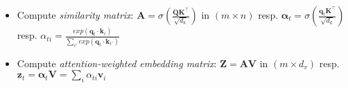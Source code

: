 \begin{itemize}
\begin{itemize}
\begin{multicols}{2}
\begin{itemize}
            \item $\boldsymbol{W}_v$ $(h \times d_v)$
            \item $\boldsymbol{V}$ $(n \times d_v)$
            \item $\boldsymbol{v}_i$ is row vector $(1 \times d_v)$
            \item $\boldsymbol{e}_i$ is row vector $(1 \times h)$
        \end{itemize}
        \end{multicols}
    \end{itemize}
    \item Compute \emph{similarity matrix}: $\boldsymbol{A} = \sigma(\frac{\boldsymbol{Q}\boldsymbol{K}^\intercal}{\sqrt{d_k}})$ in $(m \times n)$ resp. $\boldsymbol{\alpha}_{t} = \sigma(\frac{\boldsymbol{q}_t\boldsymbol{K}^\intercal}{\sqrt{d_k}})$ resp. $\alpha_{ti} = \frac{exp( \boldsymbol{q}_t \cdot \boldsymbol{k}_i )}{\sum_{i'} exp( \boldsymbol{q}_t \cdot \boldsymbol{k}_{i'} )}$
    \item Compute \emph{attention-weighted embedding matrix}: $\boldsymbol{Z} = \boldsymbol{A}\boldsymbol{V}$ in $(m \times d_v)$ resp. $\boldsymbol{z}_t = \boldsymbol{\alpha}_t\boldsymbol{V} = \sum_i \alpha_{ti} \boldsymbol{v}_i$ 
\end{itemize}
